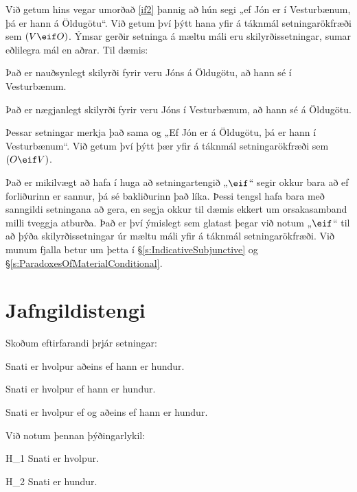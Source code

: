 Við getum hins vegar umorðað \ref{if2} þannig að hún segi „ef Jón er í Vesturbænum, þá er hann á Öldugötu“. Við getum því þýtt hana yfir á táknmál setningarökfræði sem $(V \eif O)$.
\noindent Ýmsar gerðir setninga á mæltu máli eru skilyrðissetningar, sumar eðlilegra mál en aðrar. Til dæmis:
	\begin{earg}
		\item[\ex{ifnec2}] Það er nauðsynlegt skilyrði fyrir veru Jóns á Öldugötu, að hann sé í Vesturbænum.
		\item[\ex{ifsuf2}] Það er nægjanlegt skilyrði fyrir veru Jóns í Vesturbænum, að hann sé á Öldugötu.
	\end{earg}
Þessar setningar merkja það sama og „Ef Jón er á Öldugötu, þá er hann í Vesturbænum“. Við getum því þýtt þær yfir á táknmál setningarökfræði sem $(O \eif V)$.

Það er mikilvægt að hafa í huga að setningartengið „$\eif$“ segir okkur bara að ef forliðurinn er sannur, þá sé bakliðurinn það líka. Þessi tengsl hafa bara með sanngildi setningana að gera, en segja okkur til dæmis ekkert um orsakasamband milli tveggja atburða. Það er því ýmislegt sem glatast þegar við notum „$\eif$“ til að þýða skilyrðissetningar úr mæltu máli yfir á táknmál setningarökfræði. Við munum fjalla betur um þetta í \S\ref{s:IndicativeSubjunctive} og \S\ref{s:ParadoxesOfMaterialConditional}.

\section{Jafngildistengi}
Skoðum eftirfarandi þrjár setningar:
	\begin{earg}
		\item[\ex{iff1}] Snati er hvolpur aðeins ef hann er hundur.
		\item[\ex{iff2}] Snati er hvolpur ef hann er hundur.
		\item[\ex{iff3}] Snati er hvolpur ef og aðeins ef hann er hundur.
	\end{earg}
Við notum þennan þýðingarlykil:
	\begin{ekey}
		\item[H_1] Snati er hvolpur.
		\item[H_2] Snati er hundur.
	\end{ekey}


